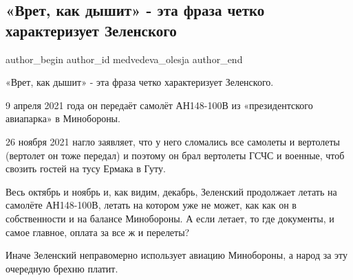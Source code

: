  
 
 
 
 
 
\subsection{«Врет, как дышит» - эта фраза четко характеризует Зеленского}
\label{sec:15_12_2021.fb.medvedeva_olesja.1.zelenskii_vret_kak_dyshyt}
 
\ifcmt
 author_begin
   author_id medvedeva_olesja
 author_end
\fi

«Врет, как дышит» - эта фраза четко характеризует Зеленского.

9 апреля 2021 года он передаёт самолёт АН148-100В из «президентского авиапарка»
в Минобороны. 


26 ноября 2021 нагло заявляет, что у него сломались все самолеты и вертолеты
(вертолет он тоже передал) и поэтому он брал вертолеты ГСЧС и военные, чтоб
свозить гостей на тусу Ермака в Гуту.

Весь октябрь и ноябрь и, как видим, декабрь, Зеленский продолжает летать на
самолёте АН148-100В, летать на котором уже не может, как как он в собственности
и на балансе Минобороны. А если летает, то где документы, и самое главное,
оплата за все ж и перелеты?

Иначе Зеленский неправомерно использует авиацию Минобороны, а народ за эту
очередную брехню платит.

